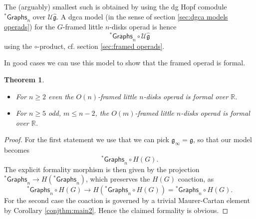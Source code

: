\documentclass[a4paper]{amsart}
\theoremstyle{plain}
\newtheorem{thm}{Theorem}
\theoremstyle{definition}
\newcommand{\alg}[1]{\mathfrak{{#1}}}
\newcommand{\R}{{\mathbb{R}}}
\newcommand{\Graphs}{{\mathsf{Graphs}}}
\newcommand{\mU}{\mathcal{U}}
\newcommand{\stG}{{}^*\Graphs}
\begin{document}
The (arguably) smallest such is obtained by using the dg Hopf comodule $\stG_n$ over $\mU\hat{\alg g}$. A dgca model (in the sense of section \ref{sec:dgca models operads}) for the $G$-framed little $n$-disks operad is hence
\[
 \stG_n \circ \mU\hat{\alg g}
\]
using the $\circ$-product, cf. section \ref{sec:framed operads}.

In good cases we can use this model to show that the framed operad is formal.
\begin{thm}
\begin{itemize}
\item For $n\geq 2$ even the $O(n)$-framed little $n$-disks operad is formal over $\R$.
\item For $n\geq 5$ odd, $m\leq n-2$, the $O(m)$-framed little $n$-disks operad is formal over $\R$.
\end{itemize}
\end{thm}
\begin{proof}
 For the first statement we use that we can pick $\alg g_\infty=\alg g$, so that our model becomes
\[
 \stG_n \circ H(G).
\]
The explicit formality morphism is then given by the projection $\stG_n\to H(\stG_n)$, which preserves the $H(G)$ coaction, as 
\[
 \stG_n \circ H(G) \to H(\stG_n \circ H(G)) = \stG_n \circ H(G).
\]
For the second case the coaction is governed by a trivial Maurer-Cartan element by Corollary \ref{conjthm:main2}.
Hence the claimed formality is obvious.
\end{proof}
\end{document}
